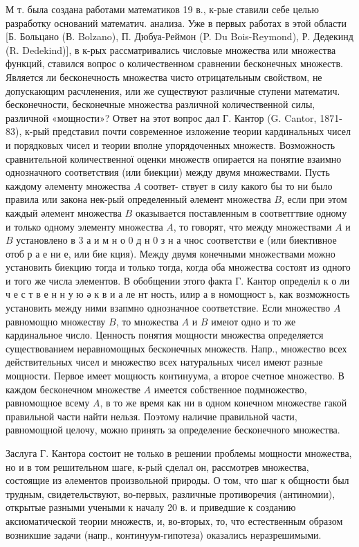 \documentclass[10pt]{article}
\begin{document}
М т. была создана работами математиков 19 в., к-рые ставили себе целью разработку оснований математич. анализа. Уже в первых работах в этой области [Б. Больцано (В. Bolzano), П. Дюбуа-Реймон (P. Du Bois-Reymond), Р. Дедекинд (R. Dedekind)], в к-рых рассматривались числовые множества или множества функций, ставился вопрос о количественном сравнении бесконечных множеств. Является ли бесконечность множества чисто отрицательным свойством, не допускающим расчленения, или же существуют различные ступени математич. бесконечности, бесконечные множества различной количественной силы, различной «мощности»? Ответ на этот вопрос дал Г. Кантор (G. Cantor, 1871-83), к-рый представил почти современное изложение теории кардинальных чисел и порядковых чисел и теории вполне упорядоченных множеств. Возможность сравнительной количественної оценки множеств опирается на понятие взаимно однозначного соответствия (или биекции) между двумя множествами. Пусть каждому әлементу множества $A$ соответ- ствует в силу какого бы то ни было правила или закона нек-рый определенный әлемент множества $B$, если при этом каждый әлемент множества $B$ оказывается поставленным в соответгтвие одному и только одному элементу множества $A$, то говорят, что между множествами $A$ и $B$ установлено в 3 а и м н о 0 д н 0 з н а чнос соответстви е (или биективное отоб р а е ни е, или бие кция). Между двумя конечными множествами можно установить биекцию тогда и только тогда, когда оба множества состоят из одного и того же числа элементов. В обобщении этого факта Г. Кантор определіл к о ли ч е с т в е н н у ю ә к в и а ле нт ность, илир а в номощност ь, как возможность установить между ними взапмно однозначное соответствие. Если множество $A$ равномощно множеству $B$, то множества $A$ и $B$ имеют одно и то же кардинальное число. Ценность понятия мощности множества определяется существованием неравномощных бесконечных множеств. Напр., множество всех действительных чисел и множество всех натуральных чисел имеют разные мощности. Первое имеет мощность континуума, а второе счетное множество. В каждом бесконечном множестве $A$ имеется собственное подмножество, равномощное всему $A$, в то же время как ни в одном конечном множестве гакой правильной части найти нельзя. Поэтому наличие правильной части, равномощной целочу, можно принять за определение бесконечного множества.



Заслуга Г. Кантора состоит не только в решении проблемы мощности множества, но и в том решительном шаге, к-рый сделал он, рассмотрев множества, состоящие из әлементов произвольной природы. О том, что шаг к общности был трудным, свидетельствуют, во-первых, различные противоречия (антиномии), открытые разными учеными к началу 20 в. и приведшие к созданию аксиоматической теории множеств, и, во-вторых, то, что естественным образом возникшие задачи (напр., континуум-гипотеза) оказались неразрешимыми.
\end{document}
